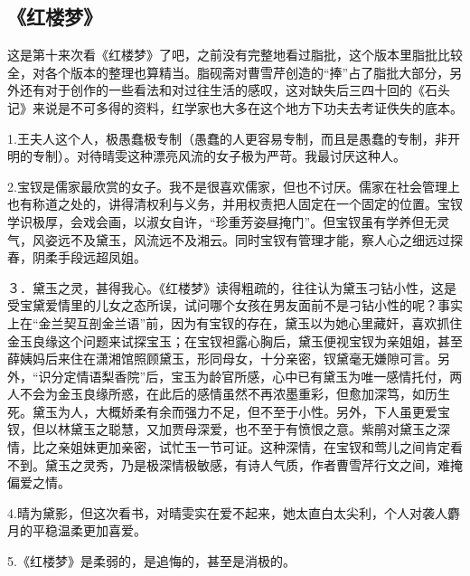 \subsection{《红楼梦》}
这是第十来次看《红楼梦》了吧，之前没有完整地看过脂批，这个版本里脂批比较全，对各个版本的整理也算精当。脂砚斋对曹雪芹创造的“捧”占了脂批大部分，另外还有对于创作的一些看法和对过往生活的感叹，这对缺失后三四十回的《石头记》来说是不可多得的资料，红学家也大多在这个地方下功夫去考证佚失的底本。

1.王夫人这个人，极愚蠢极专制（愚蠢的人更容易专制，而且是愚蠢的专制，非开明的专制）。对待晴雯这种漂亮风流的女子极为严苛。我最讨厌这种人。

2.宝钗是儒家最欣赏的女子。我不是很喜欢儒家，但也不讨厌。儒家在社会管理上也有称道之处的，讲得清权利与义务，并用权责把人固定在一个固定的位置。宝钗学识极厚，会戏会画，以淑女自许，“珍重芳姿昼掩门”。但宝钗虽有学养但无灵气，风姿远不及黛玉，风流远不及湘云。同时宝钗有管理才能，察人心之细远过探春，阴柔手段远超凤姐。

３．黛玉之灵，甚得我心。《红楼梦》读得粗疏的，往往认为黛玉刁钻小性，这是受宝黛爱情里的儿女之态所误，试问哪个女孩在男友面前不是刁钻小性的呢？事实上在“金兰契互剖金兰语”前，因为有宝钗的存在，黛玉以为她心里藏奸，喜欢抓住金玉良缘这个问题来试探宝玉；在宝钗袒露心胸后，黛玉便视宝钗为亲姐姐，甚至薛姨妈后来住在潇湘馆照顾黛玉，形同母女，十分亲密，钗黛毫无嫌隙可言。另外，“识分定情语梨香院”后，宝玉为龄官所感，心中已有黛玉为唯一感情托付，两人不会为金玉良缘所惑，在此后的感情虽然不再浓墨重彩，但愈加深笃，如历生死。黛玉为人，大概娇柔有余而强力不足，但不至于小性。另外，下人虽更爱宝钗，但以林黛玉之聪慧，又加贾母深爱，也不至于有愤恨之意。紫鹃对黛玉之深情，比之亲姐妹更加亲密，试忙玉一节可证。这种深情，在宝钗和莺儿之间肯定看不到。黛玉之灵秀，乃是极深情极敏感，有诗人气质，作者曹雪芹行文之间，难掩偏爱之情。

4.晴为黛影，但这次看书，对晴雯实在爱不起来，她太直白太尖利，个人对袭人麝月的平稳温柔更加喜爱。

5.《红楼梦》是柔弱的，是追悔的，甚至是消极的。

